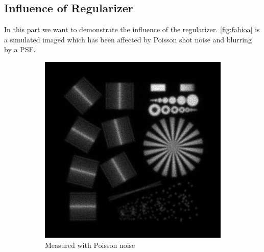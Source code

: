 \documentclass{juliacon}
\begin{document}
    \subsection{Influence of Regularizer}
        In this part we want to demonstrate the influence of the regularizer.
        \autoref{fig:fabioa} is a simulated imaged which has been affected by Poisson shot noise and blurring by a PSF.
        \begin{figure}[h]
            \begin{subfigure}[b]{.25\textwidth}
                \centering
                \includegraphics[width=\textwidth]{figures/resolution_test_chart_blurry.png}
                \caption{Measured with Poisson noise}
                \label{fig:fabioa}
            \end{subfigure}%
            \hfill
            \begin{subfigure}[b]{.25\textwidth}
                \centering

\end{subfigure}
\end{figure}
\end{document}
